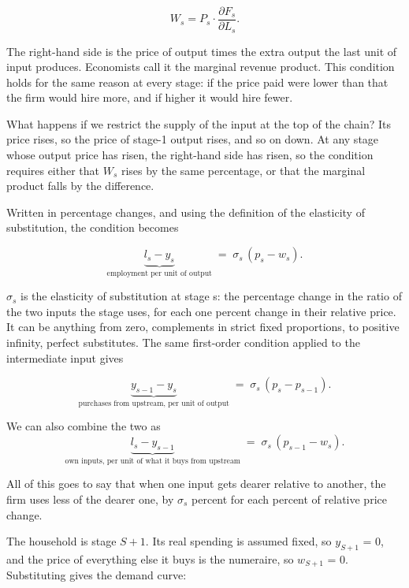 \documentclass[11pt,a4paper]{article}
\begin{document}
\begin{equation}
W_s = P_s \cdot \frac{\partial F_s}{\partial L_s} .
\end{equation}

The right-hand side is the price of output times the extra output the last unit of input produces. Economists call it the marginal revenue product. This condition holds for the same reason at every stage: if the price paid were lower than that the firm would hire more, and if higher it would hire fewer.

What happens if we restrict the supply of the input at the top of the chain? Its price rises, so the price of stage-1 output rises, and so on down. At any stage whose output price has risen, the right-hand side has risen, so the condition requires either that $W_s$ rises by the same percentage, or that the marginal product falls by the difference.

Written in percentage changes, and using the definition of the elasticity of substitution, the condition becomes

\begin{equation}
\underbrace{l_s - y_s}_{\text{employment per unit of output}} \;=\; \sigma_s \,(p_s - w_s) .
\end{equation}

$\sigma_s$ is the elasticity of substitution at stage s: the percentage change in the ratio of the two inputs the stage uses, for each one percent change in their relative price. It can be anything from zero, complements in strict fixed proportions, to positive infinity, perfect substitutes. The same first-order condition applied to the intermediate input gives

\begin{equation}
\underbrace{y_{s-1} - y_s}_{\text{purchases from upstream, per unit of output}} \;=\; \sigma_s \,(p_s - p_{s-1}) .
\end{equation}

We can also combine the two as
\begin{equation}
\underbrace{l_s - y_{s-1}}_{\text{own inputs, per unit of what it buys from upstream}} \;=\; \sigma_s \,(p_{s-1} - w_s) .
\end{equation}

All of this goes to say that when one input gets dearer relative to another, the firm uses less of the dearer one, by $\sigma_s$ percent for each percent of relative price change.

The household is stage $S+1$. Its real spending is assumed fixed, so $y_{S+1}$ = 0, and the price of everything else it buys is the numeraire, so $w_{S+1}$ = 0. Substituting gives the demand curve:
\end{document}
